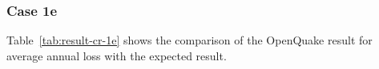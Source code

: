 \subsubsection{Case 1e}


Table~\ref{tab:result-cr-1e} shows the comparison of the OpenQuake result for average annual loss with the expected result.

% 
% 
% 
% 
% 
% 
% 
% 
% 
% 
